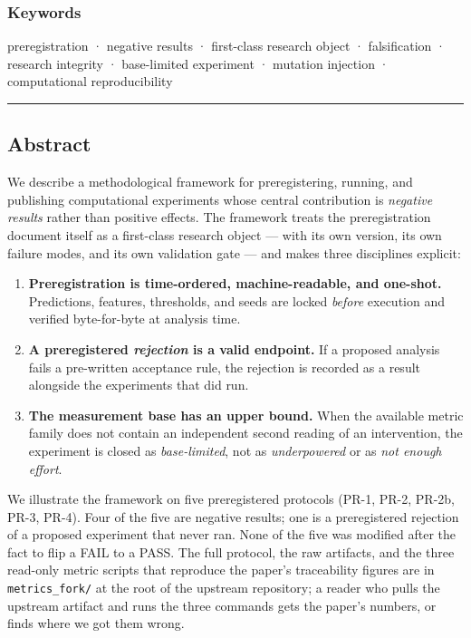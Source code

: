 \documentclass[
]{article}
\providecommand{\tightlist}{%
  \setlength{\itemsep}{0pt}\setlength{\parskip}{0pt}}
\begin{document}
\subsubsection{Keywords}\label{keywords}

preregistration · negative results · first-class research object ·
falsification · research integrity · base-limited experiment · mutation
injection · computational reproducibility

\begin{center}\rule{0.5\linewidth}{0.5pt}\end{center}

\subsection{Abstract}\label{abstract}

We describe a methodological framework for preregistering, running, and
publishing computational experiments whose central contribution is
\emph{negative results} rather than positive effects. The framework
treats the preregistration document itself as a first-class research
object --- with its own version, its own failure modes, and its own
validation gate --- and makes three disciplines explicit:

\begin{enumerate}
\def\labelenumi{\arabic{enumi}.}
\tightlist
\item
  \textbf{Preregistration is time-ordered, machine-readable, and
  one-shot.} Predictions, features, thresholds, and seeds are locked
  \emph{before} execution and verified byte-for-byte at analysis time.
\item
  \textbf{A preregistered \emph{rejection} is a valid endpoint.} If a
  proposed analysis fails a pre-written acceptance rule, the rejection
  is recorded as a result alongside the experiments that did run.
\item
  \textbf{The measurement base has an upper bound.} When the available
  metric family does not contain an independent second reading of an
  intervention, the experiment is closed as \emph{base-limited}, not as
  \emph{underpowered} or as \emph{not enough effort}.
\end{enumerate}

We illustrate the framework on five preregistered protocols (PR-1, PR-2,
PR-2b, PR-3, PR-4). Four of the five are negative results; one is a
preregistered rejection of a proposed experiment that never ran. None of
the five was modified after the fact to flip a FAIL to a PASS. The full
protocol, the raw artifacts, and the three read-only metric scripts that
reproduce the paper's traceability figures are in
\texttt{metrics\_fork/} at the root of the upstream repository; a reader
who pulls the upstream artifact and runs the three commands gets the
paper's numbers, or finds where we got them wrong.
\end{document}
